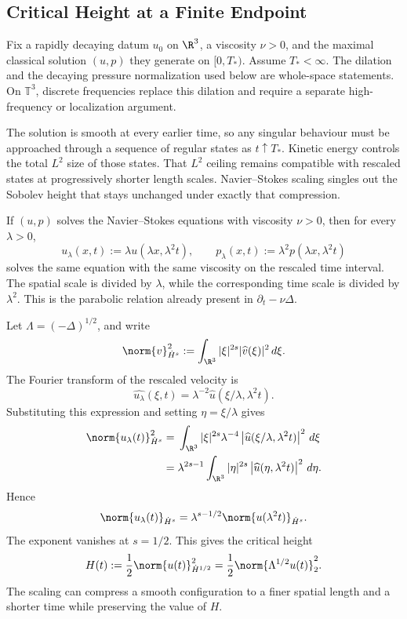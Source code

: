 
\subsection{Critical Height at a Finite Endpoint}\label{sub:CriticalHeightAtAFiniteEndpoint}

Fix a rapidly decaying datum \(u_0\) on \(\R^3\), a viscosity \(\nu>0\), and the maximal classical solution \((u,p)\) they generate on \([0,T_*)\).
Assume \(T_*<\infty\).
The dilation and the decaying pressure normalization used below are whole-space statements.
On \(\mathbb T^3\), discrete frequencies replace this dilation and require a separate high-frequency or localization argument.

The solution is smooth at every earlier time, so any singular behaviour must be approached through a sequence of regular states as \(t\uparrow T_*\).
Kinetic energy controls the total \(L^2\) size of those states.
That \(L^2\) ceiling remains compatible with rescaled states at progressively shorter length scales.
Navier--Stokes scaling singles out the Sobolev height that stays unchanged under exactly that compression.

If \((u,p)\) solves the Navier--Stokes equations with viscosity \(\nu>0\), then for every \(\lambda>0\),
\[
  u_\lambda(x,t)
  :=
  \lambda u(\lambda x,\lambda^2t),
  \qquad
  p_\lambda(x,t)
  :=
  \lambda^2p(\lambda x,\lambda^2t)
\]
solves the same equation with the same viscosity on the rescaled time interval.
The spatial scale is divided by \(\lambda\), while the corresponding time scale is divided by \(\lambda^2\).
This is the parabolic relation already present in \(\partial_t-\nu\Delta\).

Let \(\Lambda=(-\Delta)^{1/2}\), and write
\[
  \norm{v}_{\dot H^s}^2
  :=
  \int_{\R^3}
  |\xi|^{2s}|\widehat v(\xi)|^2
  \,d\xi.
\]
The Fourier transform of the rescaled velocity is
\[
  \widehat{u_\lambda}(\xi,t)
  =
  \lambda^{-2}
  \widehat u(\xi/\lambda,\lambda^2t).
\]
Substituting this expression and setting \(\eta=\xi/\lambda\) gives
\begin{align*}
  \norm{u_\lambda(t)}_{\dot H^s}^2
  &={}
  \int_{\R^3}
  |\xi|^{2s}\lambda^{-4}
  \left|\widehat u(\xi/\lambda,\lambda^2t)\right|^2
  \,d\xi
  \\
  &={}
  \lambda^{2s-1}
  \int_{\R^3}
  |\eta|^{2s}
  \left|\widehat u(\eta,\lambda^2t)\right|^2
  \,d\eta.
\end{align*}
Hence
\[
  \norm{u_\lambda(t)}_{\dot H^s}
  =
  \lambda^{s-1/2}
  \norm{u(\lambda^2t)}_{\dot H^s}.
\]
The exponent vanishes at \(s=1/2\).
This gives the critical height
\[
  H(t)
  :=
  \frac12\norm{u(t)}_{\dot H^{1/2}}^2
  =
  \frac12\norm{\Lambda^{1/2}u(t)}_2^2.
\]
The scaling can compress a smooth configuration to a finer spatial length and a shorter time while preserving the value of \(H\).

